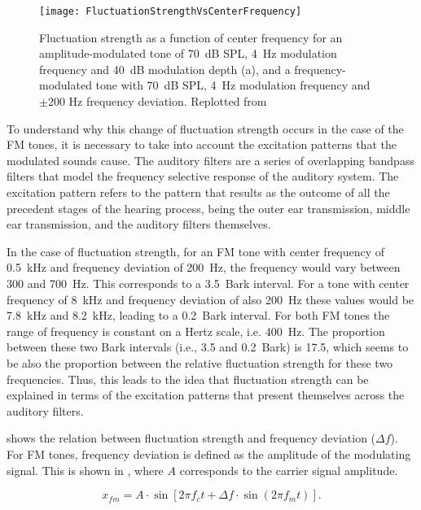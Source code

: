 \documentclass[../main.tex]{subfiles}
\begin{document}
\begin{theoreticalbackground}
\begin{figure}[!ht]
  \centering
  \texttt{[image: FluctuationStrengthVsCenterFrequency]}
  \caption{Fluctuation strength as a function of center frequency for an
    amplitude-modulated tone of 70~dB SPL, 4~Hz modulation frequency and 40~dB
    modulation depth (a), and a frequency-modulated tone with 70~dB SPL, 4~Hz
    modulation frequency and $\pm200$ Hz frequency
    deviation. Replotted from~\cite[pp. 250]{Fastl2007Psychoacoustics}}
\label{fig:flucstrenvscfreq}
\end{figure}

To understand why this change of fluctuation strength occurs in the case of the
\gls{FM} tones, it is necessary to take into account the excitation patterns
that the modulated sounds cause. The auditory filters are a series of
overlapping bandpass filters that model the frequency selective response of the
auditory system. The excitation pattern refers to the pattern that results as
the outcome of all the precedent stages of the hearing process, being the outer
ear transmission, middle ear transmission, and the auditory filters themselves.

In the case of fluctuation strength, for an \gls{FM} tone with center frequency
of 0.5~kHz and frequency deviation of 200~Hz, the frequency would vary between
300 and 700~Hz. This corresponds to a 3.5~Bark interval. For a tone with center
frequency of 8~kHz and frequency deviation of also 200~Hz these values would be
7.8~kHz and 8.2~kHz, leading to a 0.2~Bark interval. For both \gls{FM} tones the
range of frequency is constant on a Hertz scale, i.e. 400~Hz. The proportion
between these two Bark intervals (i.e., 3.5 and 0.2~Bark) is 17.5, which seems
to be also the proportion between the relative fluctuation strength for these
two frequencies. Thus, this leads to the idea that fluctuation strength can be
explained in terms of the excitation patterns that present themselves across the
auditory filters.

 shows the relation between fluctuation strength
and frequency deviation ($\Delta f$). For \gls{FM} tones, frequency deviation is
defined as the amplitude of the modulating signal. This is shown in
, where $A$ corresponds to the carrier signal amplitude.

\begin{equation}
  x_{fm} = A \cdot \sin[2\pi f_c t + \Delta f \cdot \sin(2 \pi f_m t)].
  \label{eq:theo_fm}
\end{equation}


\end{theoreticalbackground}
\end{document}
